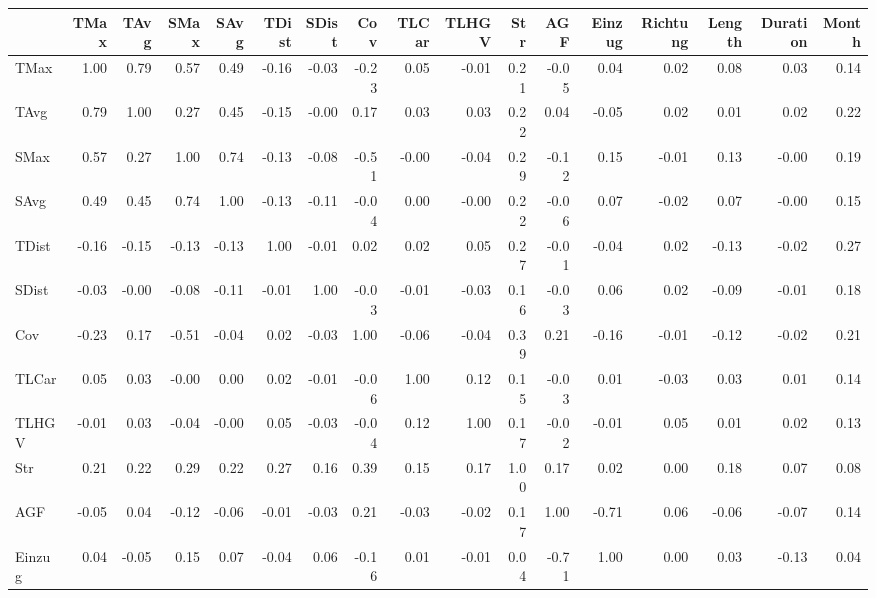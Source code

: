 \begin{tabular}{lrrrrrrrrrrrrrrrr}
\toprule
{} &  TMax &  TAvg &  SMax &  SAvg &  TDist &  SDist &   Cov &  TLCar &  TLHGV &  Str &   AGF &  Einzug &  Richtung &  Length &  Duration &  Month \\
\midrule
TMax     &  1.00 &  0.79 &  0.57 &  0.49 &  -0.16 &  -0.03 & -0.23 &   0.05 &  -0.01 & 0.21 & -0.05 &    0.04 &      0.02 &    0.08 &      0.03 &   0.14 \\
TAvg     &  0.79 &  1.00 &  0.27 &  0.45 &  -0.15 &  -0.00 &  0.17 &   0.03 &   0.03 & 0.22 &  0.04 &   -0.05 &      0.02 &    0.01 &      0.02 &   0.22 \\
SMax     &  0.57 &  0.27 &  1.00 &  0.74 &  -0.13 &  -0.08 & -0.51 &  -0.00 &  -0.04 & 0.29 & -0.12 &    0.15 &     -0.01 &    0.13 &     -0.00 &   0.19 \\
SAvg     &  0.49 &  0.45 &  0.74 &  1.00 &  -0.13 &  -0.11 & -0.04 &   0.00 &  -0.00 & 0.22 & -0.06 &    0.07 &     -0.02 &    0.07 &     -0.00 &   0.15 \\
TDist    & -0.16 & -0.15 & -0.13 & -0.13 &   1.00 &  -0.01 &  0.02 &   0.02 &   0.05 & 0.27 & -0.01 &   -0.04 &      0.02 &   -0.13 &     -0.02 &   0.27 \\
SDist    & -0.03 & -0.00 & -0.08 & -0.11 &  -0.01 &   1.00 & -0.03 &  -0.01 &  -0.03 & 0.16 & -0.03 &    0.06 &      0.02 &   -0.09 &     -0.01 &   0.18 \\
Cov      & -0.23 &  0.17 & -0.51 & -0.04 &   0.02 &  -0.03 &  1.00 &  -0.06 &  -0.04 & 0.39 &  0.21 &   -0.16 &     -0.01 &   -0.12 &     -0.02 &   0.21 \\
TLCar    &  0.05 &  0.03 & -0.00 &  0.00 &   0.02 &  -0.01 & -0.06 &   1.00 &   0.12 & 0.15 & -0.03 &    0.01 &     -0.03 &    0.03 &      0.01 &   0.14 \\
TLHGV    & -0.01 &  0.03 & -0.04 & -0.00 &   0.05 &  -0.03 & -0.04 &   0.12 &   1.00 & 0.17 & -0.02 &   -0.01 &      0.05 &    0.01 &      0.02 &   0.13 \\
Str      &  0.21 &  0.22 &  0.29 &  0.22 &   0.27 &   0.16 &  0.39 &   0.15 &   0.17 & 1.00 &  0.17 &    0.02 &      0.00 &    0.18 &      0.07 &   0.08 \\
AGF      & -0.05 &  0.04 & -0.12 & -0.06 &  -0.01 &  -0.03 &  0.21 &  -0.03 &  -0.02 & 0.17 &  1.00 &   -0.71 &      0.06 &   -0.06 &     -0.07 &   0.14 \\
Einzug   &  0.04 & -0.05 &  0.15 &  0.07 &  -0.04 &   0.06 & -0.16 &   0.01 &  -0.01 & 0.04 & -0.71 &    1.00 &      0.00 &    0.03 &     -0.13 &   0.04 \\

\end{tabular}
